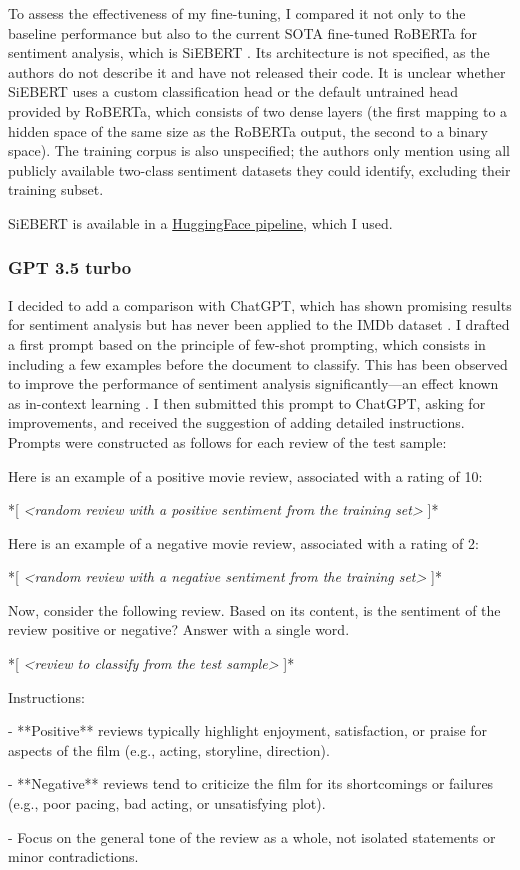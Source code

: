 \documentclass{article}
\begin{document}
To assess the effectiveness of my fine-tuning, I compared it not only to the baseline performance but also to the current SOTA fine-tuned RoBERTa for sentiment analysis, which is SiEBERT \citep{hartmann_more_2023}. Its architecture is not specified, as the authors do not describe it and have not released their code. It is unclear whether SiEBERT uses a custom classification head or the default untrained head provided by RoBERTa, which consists of two dense layers (the first mapping to a hidden space of the same size as the RoBERTa output, the second to a binary space). The training corpus is also unspecified; the authors only mention using all publicly available two-class sentiment datasets they could identify, excluding their training subset.

SiEBERT is available in a \href{https://huggingface.co/siebert/sentiment-roberta-large-english}{HuggingFace pipeline}, which I used.

\subsubsection{GPT 3.5 turbo}

I decided to add a comparison with ChatGPT, which has shown promising results for sentiment analysis but has never been applied to the IMDb dataset \citep{wang_is_2024}. I drafted a first prompt based on the principle of few-shot prompting, which consists in including a few examples before the document to classify. This has been observed to improve the performance of sentiment analysis significantly—an effect known as in-context learning \citep{brown_language_2020}. I then submitted this prompt to ChatGPT, asking for improvements, and received the suggestion of adding detailed instructions. Prompts were constructed as follows for each review of the test sample:

\begin{displayquote}
Here is an example of a positive movie review, associated with a rating of 10:

*[ \textit{<random review with a positive sentiment from the training set>} ]*

Here is an example of a negative movie review, associated with a rating of 2:

*[ \textit{<random review with a negative sentiment from the training set>} ]*

Now, consider the following review. Based on its content, is the sentiment of the review positive or negative? Answer with a single word.

*[ \textit{<review to classify from the test sample>} ]*

Instructions:

- **Positive** reviews typically highlight enjoyment, satisfaction, or praise for aspects of the film (e.g., acting, storyline, direction).

- **Negative** reviews tend to criticize the film for its shortcomings or failures (e.g., poor pacing, bad acting, or unsatisfying plot).

- Focus on the general tone of the review as a whole, not isolated statements or minor contradictions.
\end{displayquote}
\end{document}
